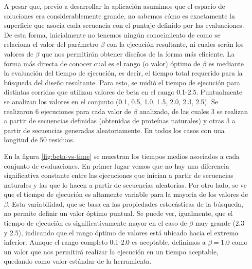A pesar que, previo a desarrollar la aplicación asumimos que el espacio de soluciones era considerablemente grande, no sabemos cómo es exactamente 
la superficie que asocia cada secuencia con el puntaje definido por las evaluaciones. 
De esta forma, inicialmente no tenemos ningún conocimiento de como se relaciona el valor del parámetro $\beta$ con la ejecución
resultante, ni cuales serán los valores de $\beta$ que nos permitirán obtener diseños de la forma más eficiente.
La forma más directa de conocer cual es el rango (o valor) óptimo de $\beta$ es mediante la evaluación del tiempo de ejecución, es decir, el tiempo total requerido para la búsqueda del diseño resultante. 
Para esto, se midió el tiempo de ejecución para distintas corridas que utilizan valores de beta en el rango 0.1-2.5.
Puntualmente se analizan los valores en el conjunto (0.1, 0.5, 1.0, 1.5, 2.0, 2.3, 2.5). 
Se realizaron 6 ejecuciones para cada valor de $\beta$ analizado, de las cuales 3 se realizan a partir de secuencias definidas (obtenidas de proteínas naturales) y otras 3 a partir de secuencias generadas aleatoriamente.
En todos los casos con una longitud de 50 residuos.

En la figura \ref{fig:beta-vs-time} se muestran los tiempos medios asociados a cada conjunto de evaluaciones.
En primer lugar vemos que no hay una diferencia significativa constante entre las ejecuciones que inician a partir de secuencias naturales y las que lo hacen a partir de secuencias aleatorias.
Por otro lado, se ve que el tiempo de ejecución es altamente variable para la mayoria de los valores de $\beta$.
Esta variabilidad, que se basa en las propiedades estocásticas de la búsqueda, no permite definir un valor óptimo puntual. Se puede ver, igualmente, que el tiempo de ejecución es significativamente mayor en el caso de $\beta$ muy grande (2.3 y 2.5), 
indicando que el rango óptimo de valores está ubicado hacia el extremo inferior.
Aunque el rango completo 0.1-2.0 es aceptable, definimos a $\beta=$1.0 como un valor que nos permitirá realizar la ejecución en un tiempo aceptable, quedando como valor estándar de la herramienta.



